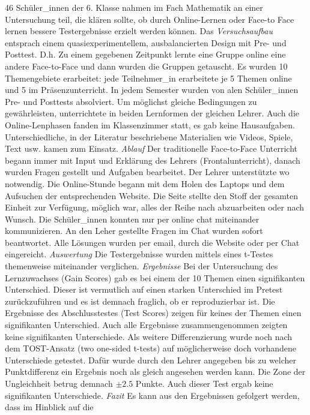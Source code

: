 46 Schüler\_innen der 6. Klasse nahmen im Fach Mathematik an einer
Untersuchung teil, die klären sollte, ob durch Online-Lernen oder
Face-to Face lernen bessere Testergebnisse erzielt werden können. Das
\emph{Versuchsaufbau} entsprach einem quasiexperimentellem,
ausbalancierten Design mit Pre- und Posttest. D.h. Zu einem gegebenen
Zeitpunkt lernte eine Gruppe online eine andere Face-to-Face und dann
wurden die Gruppen getauscht. Es wurden 10 Themengebiete erarbeitet:
jede Teilnehmer\_in erarbeitete je 5 Themen online und 5 im
Präsenzunterricht. In jedem Semester wurden von alen Schüler\_innen Pre-
und Posttests absolviert. Um möglichst gleiche Bedingungen zu
gewährleisten, unterrichtete in beiden Lernformen der gleichen Lehrer.
Auch die Online-Lenphasen fanden im Klassenzimmer statt, es gab keine
Hausaufgaben. Unterschiedliche, in der Literatur beschriebene
Materialien wie Videos, Spiele, Text usw. kamen zum Einsatz.
\emph{Ablauf} Der traditionelle Face-to-Face Unterricht begann immer mit
Input und Erklärung des Lehrers (Frontalunterricht), danach wurden
Fragen gestellt und Aufgaben bearbeitet. Der Lehrer unterstützte wo
notwendig. Die Online-Stunde begann mit dem Holen des Laptops und dem
Aufsuchen der entsprechenden Website. Die Seite stellte den Stoff der
gesamten Einheit zur Verfügung, möglich war, alles der Reihe nach
abzuarbeiten oder nach Wunsch. Die Schüler\_innen konnten nur per online
chat miteinander kommunizieren. An den Leher gestellte Fragen im Chat
wurden sofort beantwortet. Alle Lösungen wurden per email, durch die
Website oder per Chat eingereicht. \emph{Auswertung} Die Testergebnisse
wurden mittels eines t-Testes themenweise miteinander verglichen.
\emph{Ergebnisse} Bei der Untersuchung des Lernzuwachses (Gain Scores)
gab es bei einem der 10 Themen einen signifikanten Unterschied. Dieser
ist vermutlich auf einen starken Unterschied im Pretest zurückzuführen
und es ist demnach fraglich, ob er reproduzierbar ist. Die Ergebnisse
des Abschlusstestes (Test Scores) zeigen für keines der Themen einen
signifikanten Unterschied. Auch alle Ergebnisse zusammengenommen zeigten
keine signifikanten Unterschiede. Als weitere Differenzierung wurde noch
nach dem TOST-Ansatz (two one-sided t-tests) auf möglicherweise doch
vorhandene Unterschiede getestet. Dafür wurde durch den Lehrer angegeben
bis zu welcher Punktdifferenz ein Ergebnis noch als gleich angesehen
werden kann. Die Zone der Ungleichheit betrug demnach \(\pm2.5\) Punkte.
Auch dieser Test ergab keine signifikanten Unterschiede. \emph{Fazit} Es
kann aus den Ergebnissen gefolgert werden, dass im Hinblick auf die

